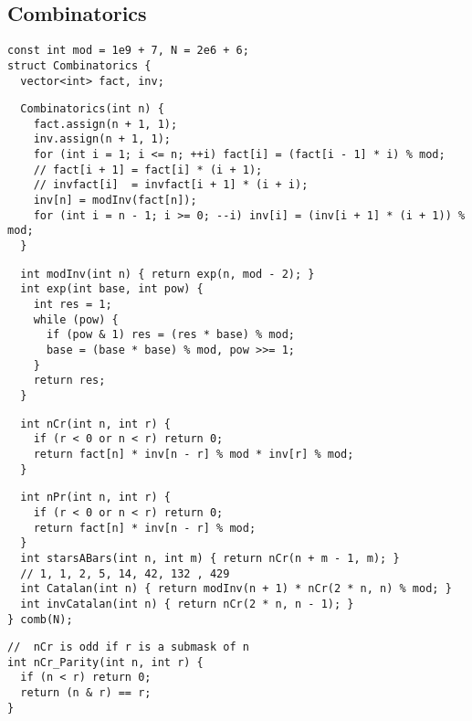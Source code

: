 \documentclass[twoside]{article}
\begin{document}
\begin{multicols*}{2}
{\subsection*{Combinatorics}
}
\begin{verbatim}
const int mod = 1e9 + 7, N = 2e6 + 6;
struct Combinatorics {
  vector<int> fact, inv;
\end{verbatim}
\vspace{-12pt}
\begin{verbatim}
  Combinatorics(int n) {
    fact.assign(n + 1, 1);
    inv.assign(n + 1, 1);
    for (int i = 1; i <= n; ++i) fact[i] = (fact[i - 1] * i) % mod;
    // fact[i + 1] = fact[i] * (i + 1);
    // invfact[i]  = invfact[i + 1] * (i + i);
    inv[n] = modInv(fact[n]);
    for (int i = n - 1; i >= 0; --i) inv[i] = (inv[i + 1] * (i + 1)) % mod;
  }
\end{verbatim}
\vspace{-12pt}
\begin{verbatim}
  int modInv(int n) { return exp(n, mod - 2); }
  int exp(int base, int pow) {
    int res = 1;
    while (pow) {
      if (pow & 1) res = (res * base) % mod;
      base = (base * base) % mod, pow >>= 1;
    }
    return res;
  }
\end{verbatim}
\vspace{-12pt}
\begin{verbatim}
  int nCr(int n, int r) {
    if (r < 0 or n < r) return 0;
    return fact[n] * inv[n - r] % mod * inv[r] % mod;
  }
\end{verbatim}
\vspace{-12pt}
\begin{verbatim}
  int nPr(int n, int r) {
    if (r < 0 or n < r) return 0;
    return fact[n] * inv[n - r] % mod;
  }
  int starsABars(int n, int m) { return nCr(n + m - 1, m); }
  // 1, 1, 2, 5, 14, 42, 132 , 429
  int Catalan(int n) { return modInv(n + 1) * nCr(2 * n, n) % mod; }
  int invCatalan(int n) { return nCr(2 * n, n - 1); }
} comb(N);
\end{verbatim}
\vspace{-12pt}
\begin{verbatim}
//  nCr is odd if r is a submask of n
int nCr_Parity(int n, int r) {
  if (n < r) return 0;
  return (n & r) == r;
}
\end{verbatim}
\vspace{-12pt}

\end{multicols*}
\end{document}
